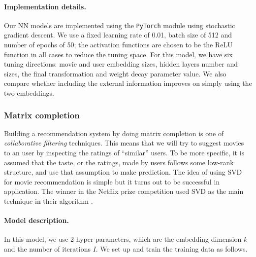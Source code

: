 \documentclass[bj, preprint]{imsart}
\begin{document}
\paragraph{Implementation details.}\label{par:method.models.nn.impl}

Our NN models are implemented using the \texttt{PyTorch} module \citep{paszke2017automatic} using stochastic gradient descent. We use a fixed learning rate of \num{0.01}, batch size of \num{512} and number of epochs of \num{50}; the activation functions are chosen to be the ReLU function in all cases to reduce the tuning space. For this model, we have six tuning directions: movie and user embedding sizes, hidden layers number and sizes, the final transformation and weight decay parameter value. We also compare whether including the external information improves on simply using the two embeddings.

\subsubsection{Matrix completion}\label{subsubsec:method.models.svd}
Building a recommendation system by doing matrix completion is one of \textit{collaborative filtering} techniques. This means that we will try to suggest movies to an user by inspecting the ratings of ``similar'' users. To be more specific, it is assumed that the taste, or the ratings, made by users follows some low-rank structure, and use that assumption to make prediction. The idea of using SVD for movie recommendation is simple but it turns out to be successful in application. The winner in the Netflix prize competition used SVD as the main technique in their algorithm \citep{bennett2007netflix}. 

\paragraph{Model description.}\label{par:method.models.svd.model}
In this model, we use 2 hyper-parameters, which are the embedding dimension $k$ and the number of iterations $I$. We set up and train the training data as follows.
\end{document}
